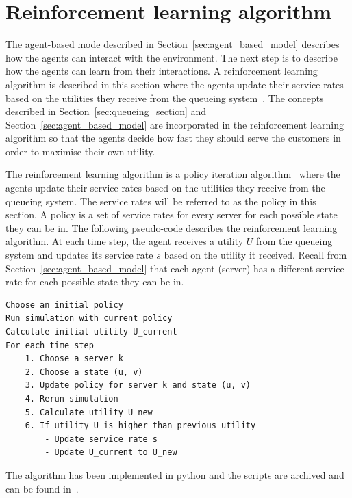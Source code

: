 \section{Reinforcement learning algorithm}\label{sec:reinforcement_learning}

The agent-based mode described in Section~\ref{sec:agent_based_model} describes
how the agents can interact with the environment.
The next step is to describe how the agents can learn from their interactions.
A reinforcement learning algorithm is described in this section where the agents
update their service rates based on the utilities they receive from the
queueing system~\cite{kaelbling1996, liu2019, ayesta2022}.
The concepts described in Section~\ref{sec:queueing_section} and
Section~\ref{sec:agent_based_model} are incorporated in the reinforcement
learning algorithm so that the agents decide how fast they should serve the
customers in order to maximise their own utility.

The reinforcement learning algorithm is a policy iteration
algorithm~\cite{mahadevan1996average} where the agents update their service
rates based on the utilities they receive from the queueing system.
The service rates will be referred to as the policy in this section.
A policy is a set of service rates for every server for each possible state
they can be in.
The following pseudo-code describes the reinforcement learning algorithm.
At each time step, the agent receives a utility $U$ from the queueing system
and updates its service rate $s$ based on the utility it received.
Recall from Section~\ref{sec:agent_based_model} that each agent (server) has
a different service rate for each possible state they can be in.

\vspace*{0.5cm}

\begin{lstlisting}
Choose an initial policy
Run simulation with current policy
Calculate initial utility U_current
For each time step
    1. Choose a server k
    2. Choose a state (u, v)
    3. Update policy for server k and state (u, v)
    4. Rerun simulation
    5. Calculate utility U_new
    6. If utility U is higher than previous utility
        - Update service rate s
        - Update U_current to U_new

\end{lstlisting}

The algorithm has been implemented in python and the scripts are archived and
can be found in~\cite{michalis_panayides_2023_7586860}.

